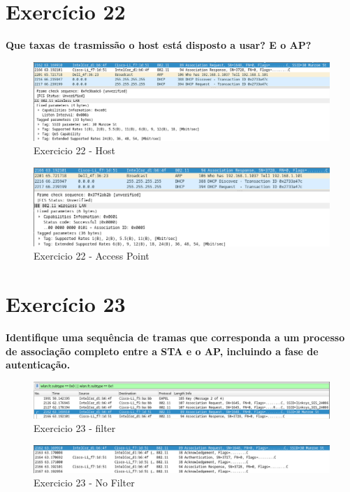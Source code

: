\documentclass[a4paper]{report}
\begin{document}
\section{Exercício 22}
\textbf{Que taxas de trasmissão o host está disposto a usar? E o AP?}
\begin{figure}[H]
    \centering 
    \includegraphics[width=\textwidth]{images/Ex22host.png}  
    \caption{Exercicio 22 - Host}
    \label{fig:ex22host}
\end{figure}

\begin{figure}[H]
    \centering 
    \includegraphics[width=\textwidth]{images/Ex22ap.png}  
    \caption{Exercicio 22 - Access Point}
    \label{fig:ex22ap}
\end{figure}

\section{Exercício 23}
\textbf{Identifique uma sequência de tramas que corresponda a um processo de
    associação completo entre a STA e o AP, incluindo a fase de autenticação.}
\begin{figure}[H]
    \centering 
    \includegraphics[width=\textwidth]{images/Ex23filtro.png}  
    \caption{Exercicio 23 - filter}
    \label{fig:ex23filter}
\end{figure}

\begin{figure}[H]
    \centering 
    \includegraphics[width=\textwidth]{images/Ex23noFiltro.png}  
    \caption{Exercicio 23 - No Filter}
    \label{fig:ex23noFiltro}
\end{figure}
\end{document}
